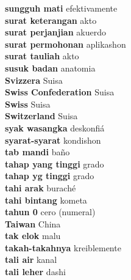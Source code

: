 \textbf{ sungguh mati  } efektivamente \\
\textbf{ surat keterangan  } akto \\
\textbf{ surat perjanjian  } akuerdo \\
\textbf{ surat permohonan  } aplikashon \\
\textbf{ surat tauliah  } akto \\
\textbf{ susuk badan  } anatomia \\
\textbf{ Svizzera  } Suisa \\
\textbf{ Swiss Confederation  } Suisa \\
\textbf{ Swiss  } Suisa \\
\textbf{ Switzerland  } Suisa \\
\textbf{ syak wasangka  } deskonfiá \\
\textbf{ syarat-syarat  } kondishon \\
\textbf{ tab mandi  } baño \\
\textbf{ tahap yang tinggi  } grado \\
\textbf{ tahap yg tinggi  } grado \\
\textbf{ tahi arak  } buraché \\
\textbf{ tahi bintang  } kometa \\
\textbf{ tahun 0  } cero (numeral) \\
\textbf{ Taiwan  } China \\
\textbf{ tak elok  } malu \\
\textbf{ takah-takahnya  } kreiblemente \\
\textbf{ tali air  } kanal \\
\textbf{ tali leher  } dashi \\
